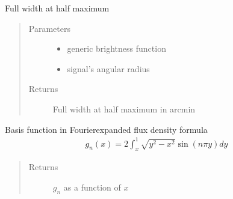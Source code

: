 \documentclass[letterpaper,10pt,english]{sphinxmanual}
\begin{document}

\begin{fulllineitems}
\label{\detokenize{diffsph.utils:diffsph.utils.tools.fwhm}}
\sphinxAtStartPar
Full width at half maximum
\begin{quote}\begin{description}
\item[{Parameters}] \leavevmode\begin{itemize}
\item {} 
\sphinxAtStartPar
{} \textendash{} generic brightness function

\item {} 
\sphinxAtStartPar
{} \textendash{} signal’s angular radius

\end{itemize}

\item[{Returns}] \leavevmode
\sphinxAtStartPar
Full width at half maximum in arcmin

\end{description}\end{quote}

\end{fulllineitems}


\begin{fulllineitems}
\label{\detokenize{diffsph.utils:diffsph.utils.tools.g}}
\sphinxAtStartPar
Basis function in Fourier\sphinxhyphen{}expanded flux density formula
\begin{equation*}
\begin{split}g_n(x)=2\int_x^1\sqrt{y^2-x^2}\sin(n\pi y) dy\end{split}
\end{equation*}\begin{quote}\begin{description}
\item[{Returns}] \leavevmode
\sphinxAtStartPar
\(g_n\) as a function of \(x\)

\end{description}\end{quote}

\end{fulllineitems}
\end{document}
